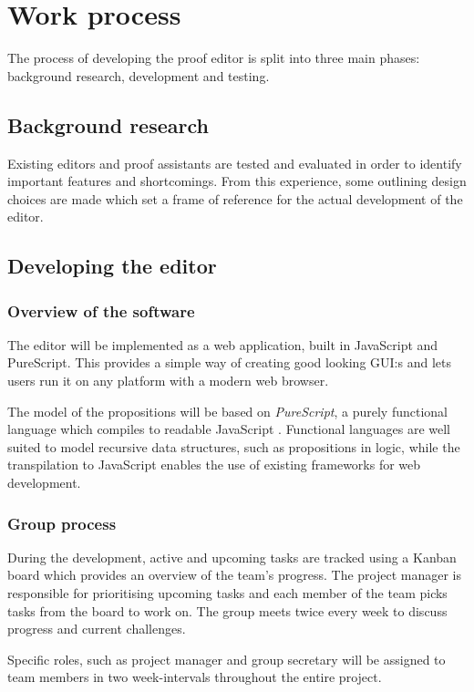 \section{Work process}
The process of developing the proof editor is split into three main phases:
background research, development and testing.

\subsection{Background research}
Existing editors and proof assistants are tested and evaluated in order to identify important features and shortcomings. From this experience, some outlining design choices are made which set a frame of reference for the actual development of the editor.

\subsection{Developing the editor}

\subsubsection{Overview of the software}
The editor will be implemented as a web application, built in JavaScript and PureScript. This provides a simple way of creating good looking GUI:s and lets users run it on any platform with a modern web browser.

The model of the propositions will be based on \textit{PureScript}, a purely functional language which compiles to readable JavaScript \cite{purescript}. Functional languages are well suited to model recursive data structures, such as propositions in logic, while the transpilation to JavaScript enables the use of existing frameworks for web development.

\subsubsection{Group process}
During the development, active and upcoming tasks are tracked using a Kanban board which provides an overview of the team's progress. The project manager is responsible for prioritising upcoming tasks and each member of the team picks tasks from the board to work on. The group meets twice every week to discuss progress and current challenges.

Specific roles, such as project manager and group secretary will be assigned to team members in two week-intervals throughout the entire project.

